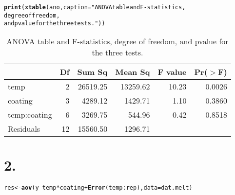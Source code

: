 \documentclass{article}\usepackage[]{graphicx}\usepackage[]{color}
\makeatletter
\newcommand{\hlstr}[1]{\textcolor[rgb]{0.192,0.494,0.8}{#1}}%
\newcommand{\hlopt}[1]{\textcolor[rgb]{0,0,0}{#1}}%
\newcommand{\hlstd}[1]{\textcolor[rgb]{0.345,0.345,0.345}{#1}}%
\newcommand{\hlkwb}[1]{\textcolor[rgb]{0.69,0.353,0.396}{#1}}%
\newcommand{\hlkwc}[1]{\textcolor[rgb]{0.333,0.667,0.333}{#1}}%
\newcommand{\hlkwd}[1]{\textcolor[rgb]{0.737,0.353,0.396}{\textbf{#1}}}%
\newenvironment{kframe}{%
 \def\at@end@of@kframe{}%
 \ifinner\ifhmode%
  \def\at@end@of@kframe{\end{minipage}}%
  \begin{minipage}{\columnwidth}%
 \fi\fi%
 \def\FrameCommand##1{\hskip\@totalleftmargin \hskip-\fboxsep
 \colorbox{shadecolor}{##1}\hskip-\fboxsep
     \hskip-\linewidth \hskip-\@totalleftmargin \hskip\columnwidth}%
 \MakeFramed {\advance\hsize-\width
   \@totalleftmargin\z@ \linewidth\hsize
   \@setminipage}}%
 {\par\unskip\endMakeFramed%
 \at@end@of@kframe}
\newenvironment{knitrout}{}{} %
\makeatother
\begin{document}
\begin{kframe}
\begin{alltt}
\hlkwd{print}\hlstd{(}\hlkwd{xtable}\hlstd{(ano,} \hlkwc{caption} \hlstd{=}\hlstr{"ANOVA table and F-statistics, 
             degree of freedom, 
             and pvalue for the three tests."}\hlstd{))}
\end{alltt}
\end{kframe}%
\begin{table}[ht]
\centering
\begin{tabular}{lrrrrr}
  \hline
 & Df & Sum Sq & Mean Sq & F value & Pr($>$F) \\ 
  \hline
temp & 2 & 26519.25 & 13259.62 & 10.23 & 0.0026 \\ 
  coating & 3 & 4289.12 & 1429.71 & 1.10 & 0.3860 \\ 
  temp:coating & 6 & 3269.75 & 544.96 & 0.42 & 0.8518 \\ 
  Residuals & 12 & 15560.50 & 1296.71 &  &  \\ 
   \hline
\end{tabular}
\caption{ANOVA table and F-statistics, 
             degree of freedom, 
             and pvalue for the three tests.} 
\end{table}


\section*{2.}
\begin{knitrout}
\color{fgcolor}\begin{kframe}
\begin{alltt}
\hlstd{res} \hlkwb{<-} \hlkwd{aov}\hlstd{(y} \hlopt{~}\hlstd{temp} \hlopt{*} \hlstd{coating} \hlopt{+} \hlkwd{Error}\hlstd{(temp}\hlopt{:}\hlstd{rep),} \hlkwc{data} \hlstd{= dat.melt)}
\end{alltt}
\end{kframe}
\end{knitrout}
\end{document}

